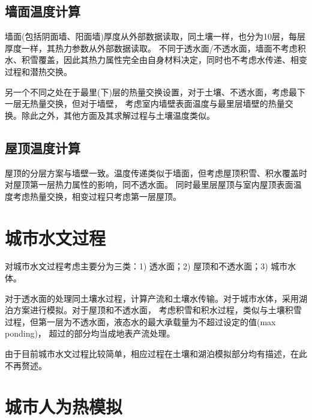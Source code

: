 \subsection{墙面温度计算}
墙面(包括阴面墙、阳面墙)厚度从外部数据读取，同土壤一样，也分为10层，每层厚度一样，其热力参数从外部数据读取。
不同于透水面/不透水面，墙面不考虑积水、积雪覆盖，因此其热力属性完全由自身材料决定，同时也不考虑水传递、相变过程和潜热交换。

另一个不同之处在于最里(下)层的热量交换设置，对于土壤、不透水面，考虑最下一层无热量交换，但对于墙壁，
考虑室内墙壁表面温度与最里层墙壁的热量交换。除此之外，其他方面及其求解过程与土壤温度类似。


\subsection{屋顶温度计算}
屋顶的分层方案与墙壁一致。温度传递类似于墙面，但考虑屋顶积雪、积水覆盖时对屋顶第一层热力属性的影响，同不透水面。
同时最里层屋顶与室内屋顶表面温度考虑热量交换，相变过程只考虑第一层屋顶。

\section{城市水文过程}
对城市水文过程考虑主要分为三类：1) 透水面；2) 屋顶和不透水面；3) 城市水体。

对于透水面的处理同土壤水过程，计算产流和土壤水传输。对于城市水体，采用湖泊方案进行模拟。对于屋顶和不透水面，
考虑积雪和积水过程，类似与土壤积雪过程，但第一层为不透水面，液态水的最大承载量为不超过设定的值(max ponding)，
超过的部分均当成地表产流处理。

由于目前城市水文过程比较简单，相应过程在土壤和湖泊模拟部分均有描述，在此不再赘述。

\section{城市人为热模拟}
